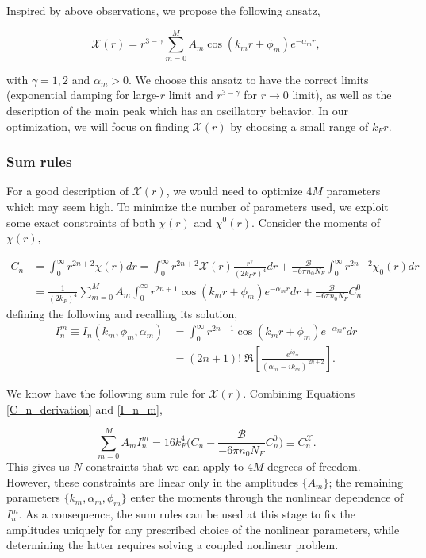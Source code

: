 \documentclass[aps,onecolumn]{revtex4-2}
\begin{document}
Inspired by above observations, we propose the following ansatz,

\begin{equation}\label{X_ansatz}
    \mathcal{X}(r)=r ^{3-\gamma}\sum_{m=0}^M A_m \cos{(k_mr +\phi_m)}e^{-\alpha_m r},
\end{equation}

with $\gamma=1,2$ and $\alpha_m>0$. We choose this ansatz to have the correct limits (exponential damping for large-$r$ limit and $r^{3-\gamma}$ for $r\rightarrow 0$ limit), as well as the description of the main peak which has an oscillatory behavior. In our optimization, we will focus on finding $\mathcal{X}(r)$ by choosing a small range of $k_Fr$.

\subsubsection{Sum rules}
For a good description of $\mathcal{X}(r)$, we would need to optimize $4M$ parameters which may seem high. To minimize the number of parameters used, we exploit some exact constraints of both $\chi(r)$ and $\chi^0(r)$. Consider the moments of $\chi(r)$,

\begin{align} \label{C_n_derivation}
    C_n & = \int_0^\infty r^{2n+2}\chi(r)dr = \int_0^\infty r^{2n+2} \mathcal{X}(r)\frac{r^\gamma}{(2k_Fr)^4}dr + \frac{\mathcal{B}}{-6\pi n_0N_F}\int_0^\infty r^{2n+2} \chi_0(r)dr \nonumber \\
        & =\frac{1}{(2k_F)^4}\sum_{m=0}^MA_m\int_0^\infty r^{2n+1}\cos{(k_mr +\phi_m)}e^{-\alpha_m r} dr + \frac{\mathcal{B}}{-6\pi n_0N_F}C_n^0
\end{align}
defining the following and recalling its solution,
\begin{align} \label{I_n_m}
    I^m_n\equiv I_n(k_m,\phi_m,\alpha_m) & =\int_0^\infty r^{2n+1}\cos{(k_mr +\phi_m)}e^{-\alpha_m r} dr \nonumber \\
                                         & =(2n+1)!\;\Re\!\left[ \frac{e^{i\phi_m}}{(\alpha_m - ik_m)^{\,2n+2}}
        \right].
\end{align}

We know have the following sum rule for $\mathcal{X}(r)$. Combining Equations \eqref{C_n_derivation} and \eqref{I_n_m},

\begin{equation}
    \sum_{m=0}^MA_mI^m_n= 16k_F^4\Big(C_n -\frac{\mathcal{B}}{-6\pi n_0N_F} C^0_n\Big) \equiv C^\mathcal{X}_n.
\end{equation}
This gives us \(N\) constraints that we can apply to \(4M\) degrees of freedom. However, these constraints are linear only in the amplitudes \(\{A_m\}\);
the remaining parameters \(\{k_m,\alpha_m,\phi_m\}\) enter the moments through
the nonlinear dependence of \(I_n^m\). As a consequence, the sum rules can be
used at this stage to fix the amplitudes uniquely for any prescribed choice of
the nonlinear parameters, while determining the latter requires solving a
coupled nonlinear problem.
\end{document}
